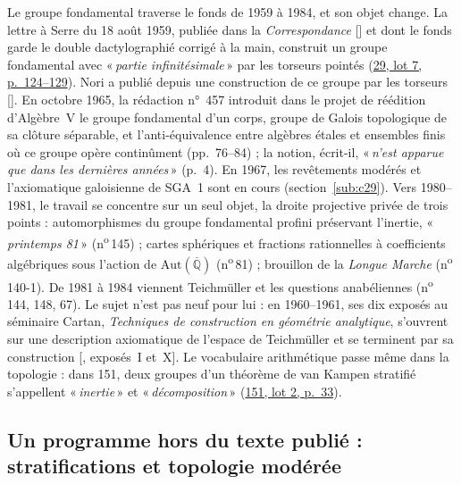 \documentclass[11pt]{amsart}
\makeatletter
\newcommand{\q}[1]{«\,\textit{#1}\,»}
\newcommand{\cote}[1]{\mbox{n\textsuperscript{o}\,#1}}
\def\RHM@first#1--#2\@nil{#1}
\DeclareRobustCommand{\lot}[3]{\begingroup\edef\RHM@pdfpage{\the\numexpr\RHM@first#3--\@nil+1\relax}\href{https://grothendieck.umontpellier.fr/#1.pdf\#page=\RHM@pdfpage}{#1, lot #2, p.~#3}\endgroup}
\newcommand{\lot}[3]{\href{https://grothendieck.commutator.io/\##1/#2/p#3}{#1, lot #2, p.~#3}}
\makeatother
\begin{document}
Le groupe fondamental traverse le fonds de 1959 à 1984, et son objet change. La lettre à Serre du 18 août 1959, publiée dans la \emph{Correspondance} [\citealp{colmez2001}] et dont le fonds garde le double dactylographié corrigé à la main, construit un groupe fondamental avec \q{partie infinitésimale} par les torseurs pointés (\lot{29}{7}{124--129}). Nori a publié depuis une construction de ce groupe par les torseurs [\citealp{nori1976,nori1982}]. En octobre 1965, la rédaction n°~457 introduit dans le projet de réédition d'Algèbre~V le groupe fondamental d'un corps, groupe de Galois topologique de sa clôture séparable, et l'anti-équivalence entre algèbres étales et ensembles finis où ce groupe opère continûment (pp.~76--84) ; la notion, écrit-il, \q{n'est apparue que dans les dernières années} (p.~4). En 1967, les revêtements modérés et l'axiomatique galoisienne de SGA~1 sont en cours (section~\ref{sub:c29}). Vers 1980--1981, le travail se concentre sur un seul objet, la droite projective privée de trois points : automorphismes du groupe fondamental profini préservant l'inertie, \q{printemps 81} (\cote{145}) ; cartes sphériques et fractions rationnelles à coefficients algébriques sous l'action de $\mathrm{Aut}(\overline{\mathbb{Q}})$ (\cote{81}) ; brouillon de la \emph{Longue Marche} (\cote{140-1}). De 1981 à 1984 viennent Teichmüller et les questions anabéliennes (\cote{144}, 148, 67). Le sujet n'est pas neuf pour lui : en 1960--1961, ses dix exposés au séminaire Cartan, \emph{Techniques de construction en géométrie analytique}, s'ouvrent sur une description axiomatique de l'espace de Teichmüller et se terminent par sa construction [\citealp{cartan1960}, exposés~I et~X]. Le vocabulaire arithmétique passe même dans la topologie : dans 151, deux groupes d'un théorème de van Kampen stratifié s'appellent \q{inertie} et \q{décomposition} (\lot{151}{2}{33}).

\subsection{Un programme hors du texte publié : stratifications et topologie modérée}\label{sub:programme}
\end{document}
